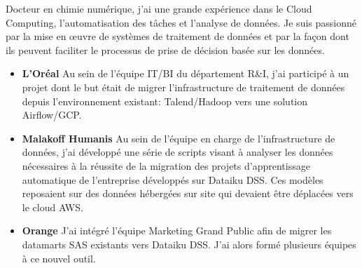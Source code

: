 \documentclass[10pt,a4paper,ragged2e,academicons]{altacv}
\begin{document}

\begin{fullwidth}
\makecvheader
\parbox{.7\paperwidth}{%
Docteur en chimie numérique, j'ai une grande expérience dans le Cloud Computing, l'automatisation des tâches et l'analyse de données. 
Je suis passionné par la mise en œuvre de systèmes de traitement de données et par la façon dont ils peuvent faciliter le processus de prise de décision basée sur les données.
}

\end{fullwidth}



\begin{itemize}
\item \textbf{L’Oréal} Au sein de l’équipe IT/BI du département R\&I, j'ai participé à un projet dont le but était de migrer l’infrastructure de traitement de données depuis l'environnement existant: Talend/Hadoop vers une solution Airflow/GCP.
\end{itemize}

\divider

\begin{itemize}
\item \textbf{Malakoff Humanis} Au sein de l'équipe en charge de l'infrastructure de données, j'ai développé une série de scripts visant à analyser les données nécessaires à la réussite de la migration des projets d'apprentissage automatique de l'entreprise développés sur Dataiku DSS. Ces modèles reposaient sur des données hébergées sur site qui devaient être déplacées vers le cloud AWS.
\item \textbf{Orange} J'ai intégré l'équipe Marketing Grand Public afin de migrer les datamarts SAS existants vers Dataiku DSS. J'ai alors formé plusieurs équipes à ce nouvel outil.\end{itemize}
\end{document}
